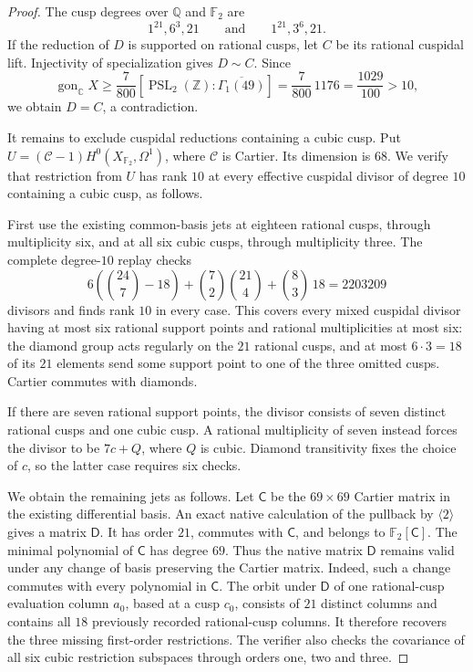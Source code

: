 \begin{proof}
The cusp degrees over $\mathbb Q$ and $\mathbb F_2$ are
\[
 1^{21},6^3,21\qquad\text{and}\qquad1^{21},3^6,21.
\]
If the reduction of $D$ is supported on rational cusps, let $C$
be its rational cuspidal lift. Injectivity of specialization gives
$D\sim C$. Since
\[
 \operatorname{gon}_{\mathbb C}X
 \geq \frac7{800}[\operatorname{PSL}_2(\mathbb Z):\overline{\Gamma_1(49)}]
 =\frac7{800}\,1176=\frac{1029}{100}>10,
\]
we obtain $D=C$, a contradiction.

It remains to exclude cuspidal reductions containing a cubic cusp.
Put $U=(\mathcal C-1)H^0(X_{\mathbb F_2},\Omega^1)$, where
$\mathcal C$ is Cartier. Its dimension is $68$. We verify that
restriction from $U$ has rank $10$ at every effective cuspidal
divisor of degree $10$ containing a cubic cusp, as follows.

First use the existing common-basis jets at eighteen rational
cusps, through multiplicity six, and at all six cubic cusps,
through multiplicity three. The complete degree-$10$ replay checks
\[
 6\left(\binom{24}{7}-18\right)
 +\binom72\binom{21}{4}+\binom83\,18
 =2203209
\]
divisors and finds rank $10$ in every case. This covers every
mixed cuspidal divisor having at most six rational support points
and rational multiplicities at most six: the diamond group acts
regularly on the $21$ rational cusps, and at most $6\cdot3=18$
of its $21$ elements send some support point to one of the three
omitted cusps. Cartier commutes with diamonds.

If there are seven rational support points, the divisor consists
of seven distinct rational cusps and one cubic cusp. A rational
multiplicity of seven instead forces the divisor to be $7c+Q$,
where $Q$ is cubic. Diamond transitivity fixes the choice of $c$,
so the latter case requires six checks.

We obtain the remaining jets as follows. Let $\mathsf C$ be the
$69\times69$ Cartier matrix in the existing differential basis.
An exact native calculation of the pullback by $\langle2\rangle$
gives a matrix $\mathsf D$. It has order $21$, commutes with
$\mathsf C$, and belongs to $\mathbb F_2[\mathsf C]$.
The minimal polynomial of $\mathsf C$ has degree $69$.
Thus the native matrix $\mathsf D$ remains valid under any change
of basis preserving the Cartier matrix. Indeed, such a change
commutes with every polynomial in $\mathsf C$.
The orbit under $\mathsf D$ of one rational-cusp evaluation
column $a_0$, based at a cusp $c_0$, consists of $21$ distinct columns and contains all
$18$ previously recorded rational-cusp columns. It therefore
recovers the three missing first-order restrictions. The verifier
also checks the covariance of all six cubic restriction subspaces
through orders one, two and three.


\end{proof}
